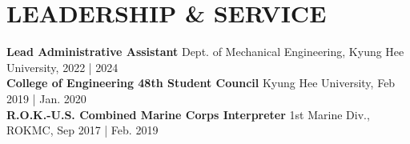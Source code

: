 \documentclass[a4paper,10pt]{extarticle}
\begin{document}


\section*{LEADERSHIP \& SERVICE}
\textbf{Lead Administrative Assistant} \hfill Dept. of Mechanical Engineering, Kyung Hee University, 2022 | 2024\\
\textbf{College of Engineering 48th Student Council} \hfill Kyung Hee University, Feb 2019 | Jan. 2020\\
\textbf{R.O.K.-U.S. Combined Marine Corps Interpreter} \hfill 1st Marine Div., ROKMC, Sep 2017 | Feb. 2019\\
\end{document}
